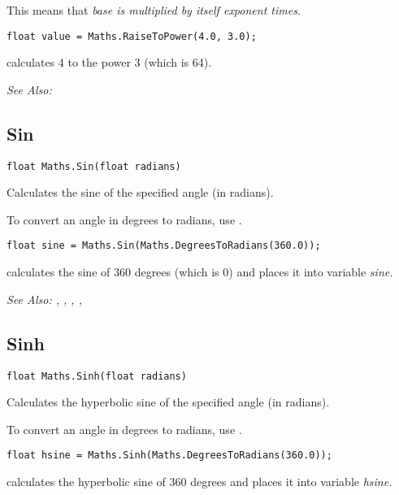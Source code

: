 This means that \it{base} is multiplied by itself \it{exponent} times.

\begin{verbatim}
float value = Maths.RaiseToPower(4.0, 3.0);
\end{verbatim}
calculates 4 to the power 3 (which is 64).

\it{See Also:} 


\subsection{Sin}\label{Maths.Sin}%

\begin{verbatim}
float Maths.Sin(float radians)
\end{verbatim}
Calculates the sine of the specified angle (in radians).

To convert an angle in degrees to radians, use .

\begin{verbatim}
float sine = Maths.Sin(Maths.DegreesToRadians(360.0));
\end{verbatim}
calculates the sine of 360 degrees (which is 0) and places it into variable \it{sine}.

\it{See Also:} ,
,
,
, 


\subsection{Sinh}\label{Maths.Sinh}%

\begin{verbatim}
float Maths.Sinh(float radians)
\end{verbatim}
Calculates the hyperbolic sine of the specified angle (in radians).

To convert an angle in degrees to radians, use .

\begin{verbatim}
float hsine = Maths.Sinh(Maths.DegreesToRadians(360.0));
\end{verbatim}
calculates the hyperbolic sine of 360 degrees and places it into variable \it{hsine}.

